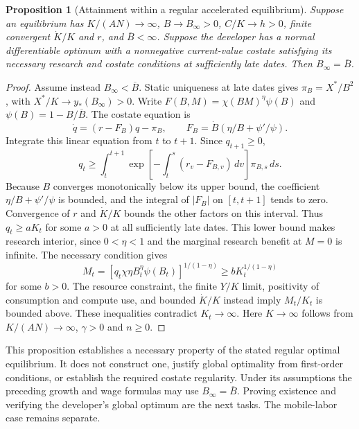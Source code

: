 \documentclass[11pt]{article}
\newtheorem{proposition}{Proposition}
\begin{document}
\begin{proposition}[Attainment within a regular accelerated equilibrium]
Suppose an equilibrium has $K/(AN)\to\infty$, $B\to B_\infty>0$,
$C/K\to h>0$, finite convergent $\dot K/K$ and $r$, and
$\overline B<\infty$. Suppose the developer has a normal differentiable
optimum with a nonnegative current-value costate satisfying its necessary
research and costate conditions at sufficiently late dates.
Then $B_\infty=\overline B$.
\end{proposition}
\begin{proof}
Assume instead $B_\infty<\overline B$. Static uniqueness at late dates
gives $\pi_B=X^*/B^2$, with $X^*/K\to y_*(B_\infty)>0$.
Write $F(B,M)=\chi(BM)^\eta\psi(B)$ and
$\psi(B)=1-B/\overline B$. The costate equation is
\[
 \dot q=(r-F_B)q-\pi_B,\qquad
 F_B=\dot B\left(\eta/B+\psi'/\psi\right).
\]
Integrate this linear equation from $t$ to $t+1$. Since $q_{t+1}\geq0$,
\[
 q_t\geq\int_t^{t+1}
 \exp\!\left[-\int_t^s(r_v-F_{B,v})\,dv\right]\pi_{B,s}\,ds.
\]
Because $B$ converges monotonically below its upper bound, the coefficient
$\eta/B+\psi'/\psi$ is bounded, and the integral of $|F_B|$ on
$[t,t+1]$ tends to zero. Convergence of $r$ and $\dot K/K$ bounds the
other factors on this interval. Thus $q_t\geq aK_t$ for some $a>0$
at all sufficiently late dates. This lower bound makes research interior,
since $0<\eta<1$ and the marginal research benefit at $M=0$ is infinite.
The necessary condition gives
\[
 M_t=[q_t\chi\eta B_t^\eta\psi(B_t)]^{1/(1-\eta)}
 \geq bK_t^{1/(1-\eta)}
\]
for some $b>0$. The resource constraint, the finite $Y/K$ limit, positivity
of consumption and compute use, and bounded $\dot K/K$ instead imply
$M_t/K_t$ is bounded above. These inequalities contradict $K_t\to\infty$.
Here $K\to\infty$ follows from $K/(AN)\to\infty$, $\gamma>0$ and $n\geq0$.
\end{proof}

This proposition establishes a necessary property of the stated regular
optimal equilibrium. It does not construct one, justify global optimality
from first-order conditions, or establish the required costate regularity.
Under its assumptions the preceding growth and wage formulas may use
$B_\infty=\overline B$. Proving existence and verifying the developer's
global optimum are the next tasks. The mobile-labor case remains separate.
\end{document}
